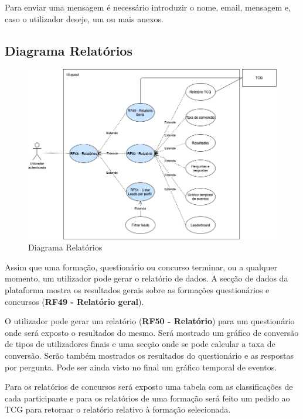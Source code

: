 Para enviar uma mensagem é necessário introduzir o nome, email, mensagem e, caso o utilizador deseje, um ou mais anexos.

\newpage

\subsection{Diagrama Relatórios}

\begin{figure}[ht!]
	\begin{center}
		\includegraphics[width=1\textwidth]{img/rf/relatorio}
		\caption{Diagrama Relatórios}
		\label{fig:rf-relatorios}
	\end{center}
\end{figure}

Assim que uma formação, questionário ou concurso terminar, ou a qualquer momento, um utilizador pode gerar o relatório de dados. A secção de dados da plataforma mostra os resultados gerais sobre as formações questionários e concursos (\textbf{RF49 - Relatório geral}). 

O utilizador pode gerar um relatório (\textbf{RF50 - Relatório}) para um questionário onde será exposto o resultados do mesmo. Será mostrado um gráfico de conversão de tipos de utilizadores finais e uma secção onde se pode calcular a taxa de conversão. Serão também mostrados os resultados do questionário e as respostas por pergunta. Pode ser ainda visto no final um gráfico temporal de eventos.

Para os relatórios de concursos será exposto uma tabela com as classificações de cada participante e para os relatórios de uma formação será feito um pedido ao TCG para retornar o relatório relativo à formação selecionada.

